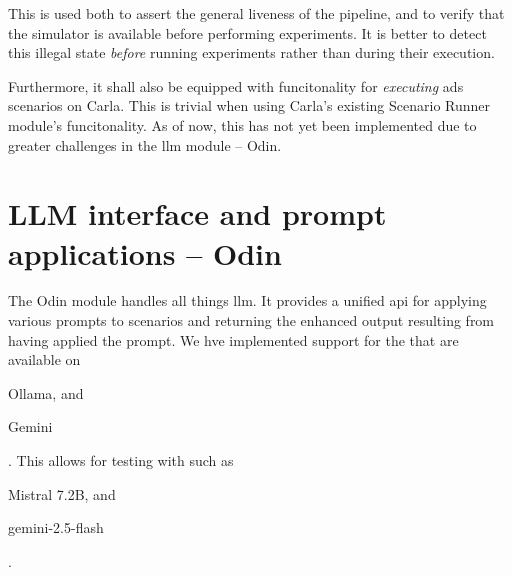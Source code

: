 This is used both to assert the general liveness of the \hefe pipeline, and to
verify that the simulator is available before performing experiments. It is
better to detect this illegal state \emph{before} running experiments rather
than during their execution.

Furthermore, it shall also be equipped with funcitonality for \emph{executing} \acrshort{ads}
scenarios on Carla. This is trivial when using Carla's existing Scenario Runner
module's funcitonality. As of now, this has not yet been implemented due to
greater challenges in the \acrshort{llm} module -- Odin.



\section{LLM interface and prompt applications -- Odin}\label{sec:odinImplementation}


The Odin module handles all things \acrshort{llm}. It provides a unified
\acrshort{api} for applying various prompts to scenarios and returning the
enhanced output resulting from having applied the prompt. We hve implemented
support for the  that are available on \begin{inparaenum}
    \item Ollama, and 
    \item Gemini
\end{inparaenum}. This allows for testing with  such as
\begin{inparaenum}\setcounter{enumi}{2}
    \item Mistral \num{7.2}B, and 
    \item gemini-2.5-flash
\end{inparaenum}.

